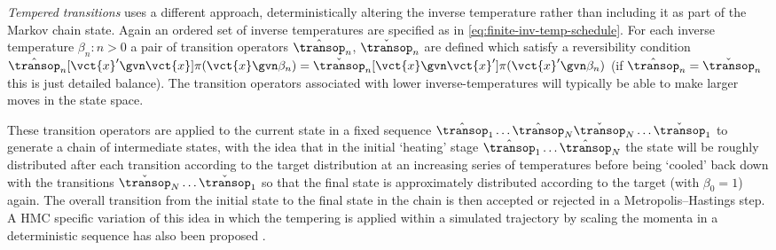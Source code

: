 \emph{Tempered transitions} \citep{neal1996sampling} uses a different approach, deterministically altering the inverse temperature rather than including it as part of the Markov chain state. Again an ordered set of inverse temperatures are specified as in \eqref{eq:finite-inv-temp-schedule}. For each inverse temperature $\beta_n : n > 0$ a pair of transition operators $\hat{\transop}_n$, $\check{\transop}_n$ are defined which satisfy a reversibility condition $\hat{\transop}_n[\vct{x}' \gvn \vct{x}] \pi(\vct{x} \gvn \beta_n) = \check{\transop}_n[ \vct{x} \gvn \vct{x}'] \pi(\vct{x}' \gvn \beta_n)$ (if $\hat{\transop}_n = \check{\transop}_n$ this is just detailed balance). The transition operators associated with lower inverse-temperatures will typically be able to make larger moves in the state space. 

These transition operators are applied to the current state in a fixed sequence $\hat{\transop}_1 \dots \hat{\transop}_N  \check{\transop}_N \dots \check{\transop}_1$ to generate a chain of intermediate states, with the idea that in the initial `heating' stage $\hat{\transop}_1 \dots \hat{\transop}_N$ the state will be roughly distributed after each transition according to the target distribution at an increasing series of temperatures before being `cooled' back down with the transitions $\check{\transop}_N \dots \check{\transop}_1$ so that the final state is approximately distributed according to the target (with $\beta_0 = 1$) again. The overall transition from the initial state to the final state in the chain is then accepted or rejected in a Metropolis--Hastings step. A \ac{HMC} specific variation of this idea in which the tempering is applied within a simulated trajectory by scaling the momenta in a deterministic sequence has also been proposed \citep{neal2011mcmc}.

